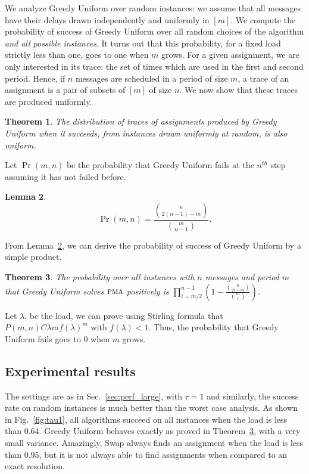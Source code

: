 \documentclass[10pt, conference, letterpaper]{algotel}
\newtheorem{theorem}{Theorem}
\newtheorem{lemma}[theorem]{Lemma}
\newcommand\pma{\textsc{pma}\xspace}
\begin{document}
We analyze Greedy Uniform over random instances: we assume that all messages have 
their delays drawn independently and uniformly in $[m]$. We compute the probability of success of Greedy Uniform over all random choices of the algorithm \emph{and all possible instances}. 
It turns out that this probability, for a fixed load strictly less than one, goes to one when $m$ grows. For a given assignment, we are only interested in its trace: the set of times which are used in the first and second period. Hence, if $n$ messages are scheduled in a period of size $m$, a trace of an assignment is a pair of subsets of $[m]$ of size $n$. We now show that these traces are produced uniformly.

\begin{theorem}
The distribution of traces of assignments produced by Greedy Uniform when it succeeds, from instances drawn uniformly at random, is also uniform.
\end{theorem}

Let $\Pr(m,n)$ be the probability that Greedy Uniform fails at the $n^{th}$ step assuming it has not failed before.

\begin{lemma}\label{lemma:proba_fail}
$$\Pr(m,n) = \frac{\binom{n}{2(n-1)-m}}{\binom{m}{n-1}}.$$
\end{lemma}

From Lemma~\ref{lemma:proba_fail}, we can derive the probability 
of success of Greedy Uniform by a simple product. 

\begin{theorem}\label{theorem:uniform}
The probability over all instances with $n$ messages and period $m$ that Greedy Uniform solves $\pma$ positively is $\displaystyle{\prod_{i=m/2}^{n-1}(1 - \frac{\binom{n}{2i-m}}{\binom{m}{i}})}$.
\end{theorem}

Let $\lambda$, be the load, we can prove using Stirling formula that
$P(m,n) C \lambda m f(\lambda)^m$ with $f(\lambda) < 1$. Thus, the probability that Greedy Uniform fails goes to $0$ when $m$ grows.

\subsection{Experimental results} \label{sec:perf_small}

 The settings are as in Sec.~\ref{sec:perf_large}, with $\tau = 1$ and 
 similarly, the success rate on random instances is much better than the worst case analysis.
As shown in Fig.~\ref{fig:tau1}, all algorithms succeed on all instances when the load is less than $0.64$. Greedy Uniform behaves exactly as proved in Theorem~\ref{theorem:uniform}, with a very small variance. Amazingly, Swap always finds an assignment when the load is less than $0.95$, but it is not always able to find assignments when compared to an exact resolution. 
\end{document}
